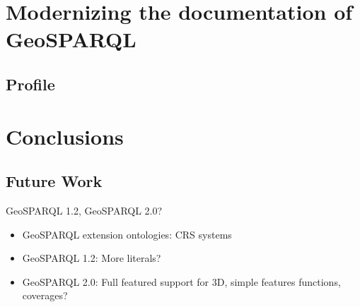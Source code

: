 \documentclass[runningheads]{llncs}
\begin{document}
\section{Modernizing the documentation of GeoSPARQL}\label{sec:documentation}


\subsection{Profile}\label{sec:profile}


\section{Conclusions}\label{sec:conclusions}

\subsection{Future Work}\label{sec:futurework}
GeoSPARQL 1.2, GeoSPARQL 2.0?
\begin{itemize}
    \item GeoSPARQL extension ontologies: CRS systems
    \item GeoSPARQL 1.2: More literals?
    \item GeoSPARQL 2.0: Full featured support for 3D, simple features functions, coverages?
\end{itemize}


%
%
%


%




\end{document}
